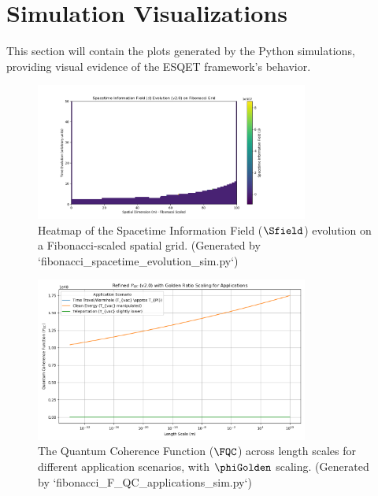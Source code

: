 \section{Simulation Visualizations}
This section will contain the plots generated by the Python simulations, providing visual evidence of the ESQET framework's behavior.

\begin{figure}[h!]
    \centering
    \includegraphics[width=0.8\textwidth]{figures/fibonacci_spacetime_evolution_v2.png} %
    \caption{Heatmap of the Spacetime Information Field ($\Sfield$) evolution on a Fibonacci-scaled spatial grid. (Generated by `fibonacci_spacetime_evolution_sim.py`)}
    \label{fig:s_evolution_v2}
\end{figure}

\begin{figure}[h!]
    \centering
    \includegraphics[width=0.8\textwidth]{figures/fibonacci_F_QC_applications_v2.png} %
    \caption{The Quantum Coherence Function ($\FQC$) across length scales for different application scenarios, with $\phiGolden$ scaling. (Generated by `fibonacci_F_QC_applications_sim.py`)}
    \label{fig:fqc_applications_v2}
\end{figure}


